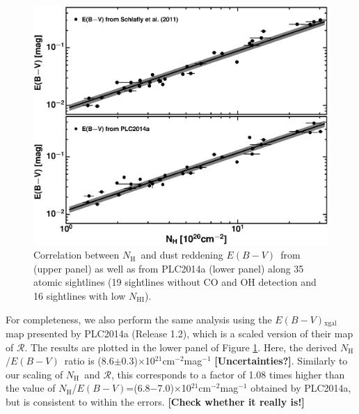 \documentclass[preprint]{emulateapj}
\def\ebv{$E(B{-}V)$}
\def\NHI{$N_\mathrm{HI}$}
\def\NH{$N_\mathrm{H}$}
\def\rad{$\mathcal{R}$}
\begin{document}
\begin{figure}
\includegraphics[width=1.0\linewidth]{fig/ebv_vs_nh.eps}
\caption{Correlation between \NH\ and dust reddening \ebv\ from \citealt{Schlafly2011} (upper panel) as well as from PLC2014a (lower panel) along 35 atomic sightlines (19 sightlines without CO and OH detection and 16 sightlines with low \NHI).}
\label{fig:ebv_vs_nh}
\end{figure}

For completeness, we also perform the same analysis using the \ebv$_\mathrm{xgal}$ map presented by PLC2014a (Release 1.2), which is a scaled version of their map of \rad. The results are plotted in the lower panel of Figure \ref{fig:ebv_vs_nh}. Here, the derived \NH/\ebv\ ratio is (8.6$\pm$0.3)$\times$10$^{21}$cm$^{-2}$mag$^{-1}$ \textbf{\color{magenta}[Uncertainties?]}. {\color{magenta} Similarly to our scaling of \NH\ and \rad,} this corresponds to a factor of 1.08 times higher than the value of \NH/\ebv=(6.8$-$7.0)$\times$10$^{21}$cm$^{-2}$mag$^{-1}$ obtained by PLC2014a, but is consistent to within the errors. \textbf{\color{magenta}[Check whether it really is!]}
\end{document}
